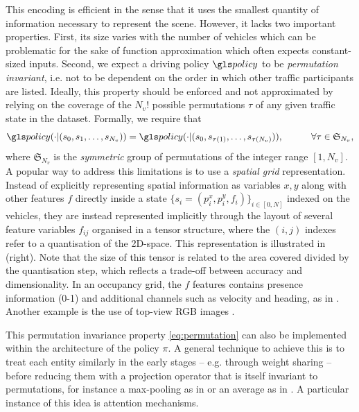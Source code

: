 This encoding is efficient in the sense that it uses the smallest quantity of information necessary to represent the scene. However, it lacks two important properties. First, its size varies with the number of vehicles which can be problematic for the sake of function approximation which often expects constant-sized inputs. Second, we expect a driving policy $\policy$ to be \emph{permutation invariant}, i.e. not to be dependent on the order in which other traffic participants are listed. Ideally, this property should be enforced and not approximated by relying on the coverage of the $N_v!$ possible permutations $\tau$ of any given traffic state in the dataset. Formally, we require that
\begin{equation}
\label{eq:permutation}
\policy(\cdot|(s_0, s_1,\dotsc,s_{N_v})) = \policy(\cdot|(s_0, s_{\tau(1)},\dotsc,s_{\tau(N_v)})), \quad\quad\quad \forall\tau \in \mathfrak{S}_{N_v},
\end{equation}
where $\mathfrak{S}_{N_v}$ is the \emph{symmetric} group of permutations of the integer range $[1,N_v]$.
A popular way to address this limitations is to use a \emph{spatial grid} representation. Instead of explicitly representing spatial information as variables $x, y$ along with other features $f$ directly inside a state $\{s_i=(p^x_i,p^y_i,f_i)\}_{i\in[0,N]}$ indexed on the vehicles, they are instead represented implicitly through the layout of several feature variables $f_{ij}$ organised in a tensor structure, where the $(i,j)$ indexes refer to a quantisation of the 2D-space. This representation is illustrated in  (right). Note that the size of this tensor is related to the area covered divided by the quantisation step, which reflects a trade-off between accuracy and dimensionality.
In an occupancy grid, the $f$ features contains presence information (0-1) and additional channels such as velocity and heading, as in \citep[e.g.][]{Isele2018, Fridman2018, Bansal2018, Rehder2017c}. Another example is the use of top-view RGB images \citep[e.g.][]{Bagnell2010, Rehder2017, Rehder2017c, Liu2018}.


This permutation invariance property \eqref{eq:permutation} can also be implemented within the architecture of the policy $\pi$. A general technique to achieve this is to treat each entity similarly in the early stages -- e.g. through weight sharing -- before reducing them with a projection operator that is itself invariant to permutations, for instance a max-pooling as in \citep{Chen2017,Hoel2018} or an average as in \citep{Qi2016}. A particular instance of this idea is attention mechanisms.


